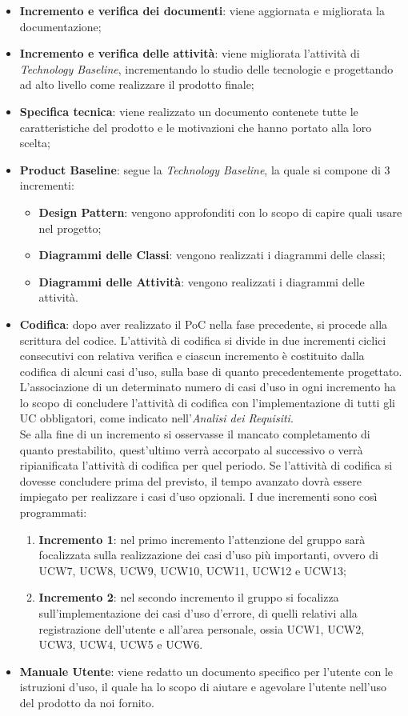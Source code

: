 \begin{itemize}
	\item \textbf{Incremento e verifica dei documenti}: viene aggiornata e migliorata la documentazione;
	\item \textbf{Incremento e verifica delle attività}: viene migliorata l’attività di \textit{Technology Baseline}\glo{}, incrementando lo studio delle tecnologie e progettando ad alto livello come realizzare il prodotto finale;
	\item \textbf{Specifica tecnica}: viene realizzato un documento contenete tutte le caratteristiche del prodotto e le motivazioni che hanno portato alla loro scelta;
	\item \textbf{Product Baseline}: segue la \textit{Technology Baseline}, la quale si compone di 3 incrementi:
		\begin{itemize}
			\item \textbf{Design Pattern\glo{}}: vengono approfonditi con lo scopo di capire quali usare nel progetto;
			\item \textbf{Diagrammi delle Classi}: vengono realizzati i diagrammi delle classi;
			\item \textbf{Diagrammi delle Attività}: vengono realizzati i diagrammi delle attività.
		\end{itemize}
	\item \textbf{Codifica}: dopo aver realizzato il PoC nella fase precedente, si procede alla scrittura del codice. L'attività di codifica si divide in due incrementi ciclici consecutivi con relativa verifica e ciascun incremento è costituito dalla codifica di alcuni casi d'uso\glo{}, sulla base di quanto precedentemente progettato. L’associazione di un determinato numero di casi d’uso in ogni incremento ha lo scopo di concludere l'attività di codifica con l’implementazione di tutti gli UC obbligatori, come indicato nell'\textit{Analisi dei Requisiti}. \\ Se alla fine di un incremento si osservasse il mancato completamento di quanto prestabilito, quest’ultimo verrà accorpato al successivo o verrà ripianificata l’attività di codifica per quel periodo. Se l'attività di codifica si dovesse concludere prima del previsto, il tempo avanzato dovrà essere impiegato per realizzare i casi d'uso opzionali. I due incrementi sono così programmati:
		\begin{enumerate}
			\item \textbf{Incremento 1}: nel primo incremento l'attenzione del gruppo sarà focalizzata sulla realizzazione dei casi d'uso più importanti, ovvero di UCW7, UCW8, UCW9, UCW10, UCW11, UCW12 e UCW13;
			\item \textbf{Incremento 2}: nel secondo incremento il gruppo si focalizza sull'implementazione dei casi d'uso d'errore, di quelli relativi alla registrazione dell'utente e all'area personale, ossia UCW1, UCW2, UCW3, UCW4, UCW5 e UCW6.  
		\end{enumerate}
	\item \textbf{Manuale Utente}: viene redatto un documento specifico per l'utente con le istruzioni d'uso, il quale ha lo scopo di aiutare e agevolare l’utente nell’uso del prodotto da noi fornito.
\end{itemize}

